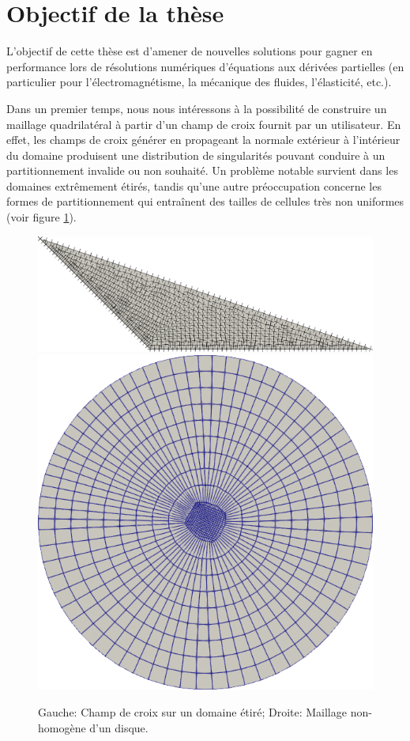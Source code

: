 \section{Objectif de la thèse}
\label{thesis_target}

L'objectif de cette thèse est d'amener de nouvelles solutions pour gagner en performance lors de résolutions numériques d'équations aux dérivées partielles (en particulier pour l'électromagnétisme, la mécanique des fluides, l'élasticité, etc.).

Dans un premier temps, nous nous intéressons à la possibilité de construire un maillage quadrilatéral à partir d'un champ de croix fournit par un utilisateur. En effet, les champs de croix générer en propageant la normale extérieur à l'intérieur du domaine \cite{kowalski2013pde} produisent une distribution de singularités pouvant conduire à un partitionnement invalide ou non souhaité. Un problème notable survient dans les domaines extrêmement étirés, tandis qu'une autre préoccupation concerne les formes de partitionnement qui entraînent des tailles de cellules très non uniformes (voir figure \ref{fig:dom_etire_mesh_inhomogene}).

\begin{figure}[!h]
    \centering
    \includegraphics[scale=0.189]{images/stretch.pdf}
    \includegraphics[scale=0.245]{images/new_cercle.png}
    \caption{Gauche: Champ de croix sur un domaine étiré; Droite: Maillage non-homogène d'un disque.}
    \label{fig:dom_etire_mesh_inhomogene}
\end{figure}

